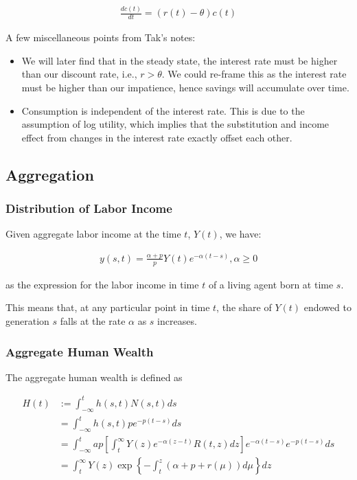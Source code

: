 \documentclass[10pt]{article}
\begin{document}
\begin{align}
    \frac{d c(t)}{d t}=(r(t)-\theta) c(t)
\end{align}

\begin{notes}
    A few miscellaneous points from Tak's notes:
    \begin{itemize}
        \item We will later find that in the steady state, the
            interest rate must be higher than our discount rate, i.e., $r > \theta$.
            We could re-frame this as the interest rate must be higher than 
            our impatience, hence savings will accumulate over time.
        \item Consumption is independent of the interest rate. This 
            is due to the assumption of log utility, which implies 
            that the substitution and income effect from changes in 
            the interest rate exactly offset each other.
    \end{itemize}
\end{notes}

\subsection{Aggregation}

\subsubsection{Distribution of Labor Income}

Given aggregate labor income at the time $t$, $Y(t)$, we have:

\begin{align}
    y(s, t)=\frac{\alpha+p}{p} Y(t) e^{-\alpha(t-s)}, \alpha \geq 0
\end{align}

as the expression for the labor income in time $t$ of a living agent born at time $s$.

This means that, at any particular point in time $t$, the share of $Y(t)$ endowed to generation $s$ falls at the rate $\alpha$ as $s$ increases.

\subsubsection{Aggregate Human Wealth}

The aggregate human wealth is defined as

\begin{align}
    H(t)&:=\int_{-\infty}^t h(s, t) N(s, t) d s \\
    &=\int_{-\infty}^t h(s, t) p e^{-p(t-s)} d s \\
    &= \int_{-\infty}^t a p\left[\int_t^{\infty} Y(z) e^{-\alpha(z-t)} R(t, z) d z\right] e^{-\alpha(t-s)} e^{-p(t-s)} d s \\
    &=\int_t^{\infty} Y(z) \exp \left\{-\int_t^z(\alpha+p+r(\mu)) d \mu\right\} d z
\end{align}
\end{document}
